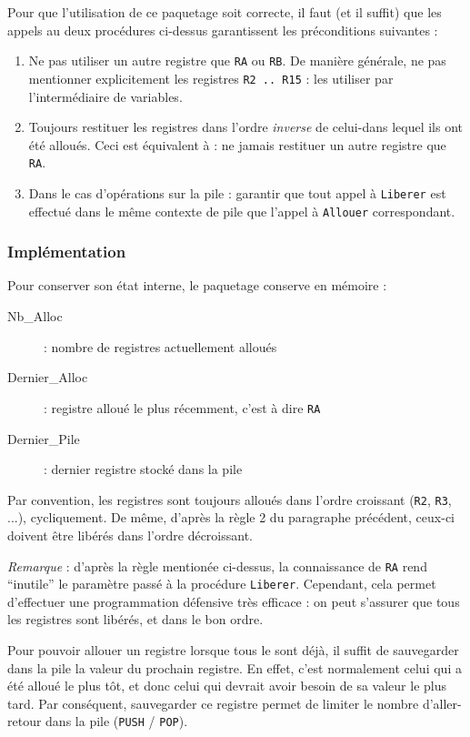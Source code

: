 Pour que l'utilisation de ce paquetage soit correcte, il faut (et il suffit) que les appels au deux procédures ci-dessus garantissent les préconditions suivantes :
\begin{enumerate}
\item Ne pas utiliser un autre registre que \verb!RA! ou \verb!RB!. De manière générale, ne pas mentionner explicitement les registres \verb!R2 .. R15! : les utiliser par l'intermédiaire de variables.
\item Toujours restituer les registres dans l'ordre \emph{inverse} de celui-dans lequel ils ont été alloués. Ceci est équivalent à : ne jamais restituer un autre registre que \verb!RA!.
\item Dans le cas d'opérations sur la pile : garantir que tout appel à \verb!Liberer! est effectué dans le même contexte de pile que l'appel à \verb!Allouer! correspondant.
\end{enumerate}

\subsubsection{Implémentation}

Pour conserver son état interne, le paquetage conserve en mémoire :
\begin{description}
\item[Nb\_Alloc] : nombre de registres actuellement alloués
\item[Dernier\_Alloc] : registre alloué le plus récemment, c'est à dire \verb!RA!
\item[Dernier\_Pile] : dernier registre stocké dans la pile
\end{description}

Par convention, les registres sont toujours alloués dans l'ordre croissant (\verb!R2!, \verb!R3!, ...), cycliquement. De même, d'après la règle 2 du paragraphe précédent, ceux-ci doivent être libérés dans l'ordre décroissant.

\emph{Remarque} : d'après la règle mentionée ci-dessus, la connaissance de \verb!RA! rend ``inutile'' le paramètre passé à la procédure \verb!Liberer!. Cependant, cela permet d'effectuer une programmation défensive très efficace : on peut s'assurer que tous les registres sont libérés, et dans le bon ordre.

Pour pouvoir allouer un registre lorsque tous le sont déjà, il suffit de sauvegarder dans la pile la valeur du prochain registre. En effet, c'est normalement celui qui a été alloué le plus tôt, et donc celui qui devrait avoir besoin de sa valeur le plus tard. Par conséquent, sauvegarder ce registre permet de limiter le nombre d'aller-retour dans la pile (\verb!PUSH! / \verb!POP!).

